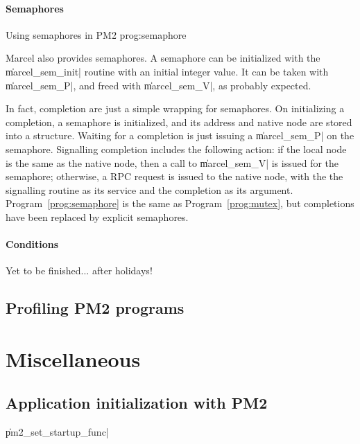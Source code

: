 \paragraph{Semaphores}

 {Using semaphores in PM2}
{prog:semaphore}


Marcel also provides semaphores. A semaphore can be initialized with
the \|marcel_sem_init| routine with an initial integer value. It can
be taken with \|marcel_sem_P|, and freed with \|marcel_sem_V|, as
probably expected.

In fact, completion are just a simple wrapping for semaphores. On
initializing a completion, a semaphore is initialized, and its address
and native node are stored into a structure. Waiting for a completion
is just issuing a \|marcel_sem_P| on the semaphore.  Signalling
completion includes the following action: if the local node is the
same as the native node, then a call to \|marcel_sem_V| is issued for
the semaphore; otherwise, a RPC request is issued to the native node,
with the the signalling routine as its service and the completion as
its argument. Program~\ref{prog:semaphore} is the same as
Program~\ref{prog:mutex}, but completions have been replaced by
explicit semaphores.

\paragraph{Conditions}


\begin{note}
  Yet to be finished... after holidays!
\end{note}




\subsection{Profiling PM2 programs}
\label{sec:profiling}

\section{Miscellaneous}

\subsection{Application initialization with PM2}
\label{sec:startupfunc}

\|pm2_set_startup_func|

